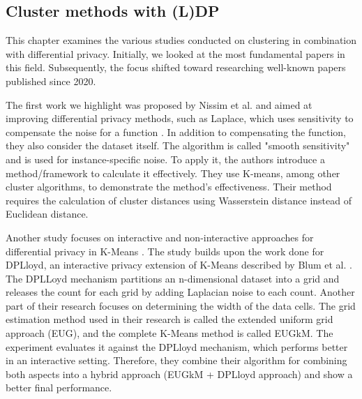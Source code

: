 \subsection{Cluster methods with (L)DP}
This chapter examines the various studies conducted on clustering in combination with differential privacy.
Initially, we looked at the most fundamental papers in this field. Subsequently, the focus shifted toward researching well-known papers published since 2020.

The first work we highlight was proposed by Nissim et al. and aimed at improving differential privacy methods, such as Laplace, which uses sensitivity to compensate the noise for a function \citep{nissim_smooth_2007}.
In addition to compensating the function, they also consider the dataset itself.
The algorithm is called "smooth sensitivity" and is used for instance-specific noise.
To apply it, the authors introduce a method/framework to calculate it effectively.
They use K-means, among other cluster algorithms, to demonstrate the method's effectiveness.
Their method requires the calculation of cluster distances using Wasserstein distance instead of Euclidean distance.

Another study focuses on interactive and non-interactive approaches for differential privacy in K-Means \citep{su_differentially_2015}.
The study builds upon the work done for DPLloyd, an interactive privacy extension of K-Means described by Blum et al. \citep{blum_practical_2005}.
The DPLLoyd mechanism partitions an n-dimensional dataset into a grid and releases the count for each grid by adding Laplacian noise to each count.
Another part of their research focuses on determining the width of the data cells.
The grid estimation method used in their research is called the extended uniform grid approach (EUG), and the complete K-Means method is called EUGkM.
The experiment evaluates it against the DPLloyd mechanism, which performs better in an interactive setting.
Therefore, they combine their algorithm for combining both aspects into a hybrid approach (EUGkM + DPLloyd approach) and show a better final performance.

